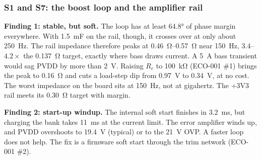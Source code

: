 \subsubsection{S1 and S7: the boost loop and the amplifier rail}\label{sec:s1}\label{sec:s7}

\textbf{Finding 1: stable, but soft.} The loop has at least \ang{64.8} of phase margin everywhere. With \qty{1.5}{\milli\farad} on the rail, though, it crosses over at only about \qty{250}{\hertz}. The rail impedance therefore peaks at \qtyrange{0.46}{0.57}{\ohm} near \qty{150}{\hertz}, 3.4--$4.2\times$ the \qty{0.137}{\ohm} target, exactly where bass draws current. A \qty{5}{\ampere} bass transient would sag PVDD by more than \qty{2}{\volt}. Raising $R_c$ to \qty{100}{\kilo\ohm} (ECO-001 \#1) brings the peak to \qty{0.16}{\ohm} and cuts a load-step dip from \qty{0.97}{\volt} to \qty{0.34}{\volt}, at no cost. The worst impedance on the board sits at \qty{150}{\hertz}, not at gigahertz. The +3V3 rail meets its \qty{0.30}{\ohm} target with margin.

\textbf{Finding 2: start-up windup.} The internal soft start finishes in \qty{3.2}{\milli\second}, but charging the bank takes \qty{11}{\milli\second} at the current limit. The error amplifier winds up, and PVDD overshoots to \qty{19.4}{\volt} (typical) or to the \qty{21}{\volt} OVP. A faster loop does not help. The fix is a firmware soft start through the trim network (ECO-001 \#2).

